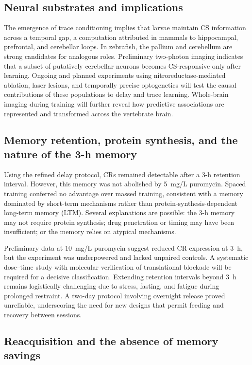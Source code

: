 \subsection{Neural substrates and implications}

The emergence of trace conditioning implies that larvae maintain CS information across a temporal gap, a computation attributed in mammals to hippocampal, prefrontal, and cerebellar loops. In zebrafish, the pallium and cerebellum are strong candidates for analogous roles. Preliminary two-photon imaging indicates that a subset of putatively cerebellar neurons becomes CS-responsive only after learning. Ongoing and planned experiments using nitroreductase-mediated ablation, laser lesions, and temporally precise optogenetics will test the causal contributions of these populations to delay and trace learning. Whole-brain imaging during training will further reveal how predictive associations are represented and transformed across the vertebrate brain.

\subsection{Memory retention, protein synthesis, and the nature of the 3-h memory}

Using the refined delay protocol, CRs remained detectable after a 3-h retention interval. However, this memory was not abolished by 5~mg/L puromycin. Spaced training conferred no advantage over massed training, consistent with a memory dominated by short-term mechanisms rather than protein-synthesis-dependent long-term memory (LTM). Several explanations are possible: the 3-h memory may not require protein synthesis; drug penetration or timing may have been insufficient; or the memory relies on atypical mechanisms.

Preliminary data at 10~mg/L puromycin suggest reduced CR expression at 3~h, but the experiment was underpowered and lacked unpaired controls. A systematic dose--time study with molecular verification of translational blockade will be required for a decisive classification. Extending retention intervals beyond 3~h remains logistically challenging due to stress, fasting, and fatigue during prolonged restraint. A two-day protocol involving overnight release proved unreliable, underscoring the need for new designs that permit feeding and recovery between sessions.

\subsection{Reacquisition and the absence of memory savings}

